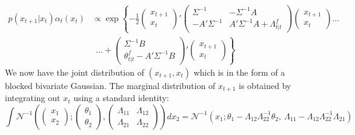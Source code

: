 \documentclass[12pt]{article}
\begin{document}
\begin{align*}
p(x_{t+1}|x_t)\alpha_t(x_t)&\propto \exp\left\{-\frac{1}{2}\begin{pmatrix}x_{t+1}\\x_t\end{pmatrix}'
    \begin{pmatrix}\Sigma^{-1} & -\Sigma^{-1}A\\
    -A'\Sigma^{-1} & A'\Sigma^{-1}A + \Lambda^f_{t|t}\end{pmatrix}\begin{pmatrix}x_{t+1}\\x_t\end{pmatrix}\right. \ldots\\
    &~~\ldots+ \left. \begin{pmatrix}\Sigma^{-1}B\\ \theta^f_{t|t}-A'\Sigma^{-1}B\end{pmatrix}'\begin{pmatrix}x_{t+1}\\x_t\end{pmatrix}\right\}
\end{align*}
We now have the joint distribution of $(x_{t+1},x_t)$ which is in the form of a blocked bivariate Gaussian. The marginal distribution of $x_{t+1}$ is obtained by integrating out $x_t$ using a standard identity:
\[\int\mathcal{N}^{-1}\left(\begin{pmatrix}x_1\\ x_2\end{pmatrix} ; \begin{pmatrix}\theta_1\\ \theta_2\end{pmatrix}, \begin{pmatrix}\Lambda_{11} & \Lambda_{12} \\ \Lambda_{21}& \Lambda_{22}\end{pmatrix}\right)dx_2 = \mathcal{N}^{-1}(x_1;\theta_1-\Lambda_{12}\Lambda_{22}^{-1}\theta_2, ~ \Lambda_{11} - \Lambda_{12}\Lambda_{22}^{-1}\Lambda_{21})\]
\end{document}
